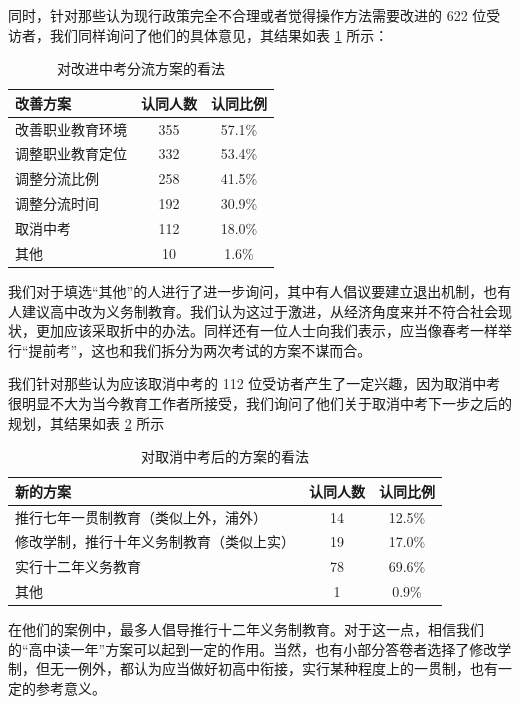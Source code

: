 \documentclass[12pt,UTF8]{ctexart}
\begin{document}
\par {
	同时，针对那些认为现行政策完全不合理或者觉得操作方法需要改进的 622 位受访者，我们同样询问了他们的具体意见，其结果如表 \ref{fig:3} 所示：
}
\begin{table}[htbp]
	\centering
	\caption{对改进中考分流方案的看法}
	\label{fig:3}
	\begin{tabular}{lcc}
		\hline
		\hline
		{\bf 改善方案} & {\bf 认同人数} & {\bf 认同比例}\\ \hline
		改善职业教育环境 & 355 & 57.1\% \\
		调整职业教育定位 & 332 & 53.4\% \\
		调整分流比例 & 258 & 41.5\% \\
		调整分流时间 & 192 & 30.9\% \\
		取消中考 & 112 & 18.0\% \\
		其他 & 10 & 1.6\% \\
		\hline
		\hline
	\end{tabular}
\end{table}
\par {
	
	我们对于填选“其他”的人进行了进一步询问，其中有人倡议要建立退出机制，也有人建议高中改为义务制教育。我们认为这过于激进，从经济角度来并不符合社会现状，更加应该采取折中的办法。同样还有一位人士向我们表示，应当像春考一样举行“提前考”，这也和我们拆分为两次考试的方案不谋而合。
}
\par {
	我们针对那些认为应该取消中考的 112
	位受访者产生了一定兴趣，因为取消中考很明显不大为当今教育工作者所接受，我们询问了他们关于取消中考下一步之后的规划，其结果如表 \ref{fig:4} 所示
}
\begin{table}[htbp]
	\centering
	\caption{对取消中考后的方案的看法}
	\label{fig:4}
	\begin{tabular}{lcc}
		\hline
		\hline
		{\bf 新的方案} & {\bf 认同人数} & {\bf 认同比例}\\ \hline
		推行七年一贯制教育（类似上外，浦外） & 14 & 12.5\% \\
		修改学制，推行十年义务制教育（类似上实） & 19 & 17.0\% \\
		实行十二年义务教育 & 78 & 69.6\% \\
		其他 & 1 & 0.9\% \\
		\hline
		\hline
	\end{tabular}
\end{table}
\par {
	
	在他们的案例中，最多人倡导推行十二年义务制教育。对于这一点，相信我们的“高中读一年”方案可以起到一定的作用。当然，也有小部分答卷者选择了修改学制，但无一例外，都认为应当做好初高中衔接，实行某种程度上的一贯制，也有一定的参考意义。
}
\end{document}

